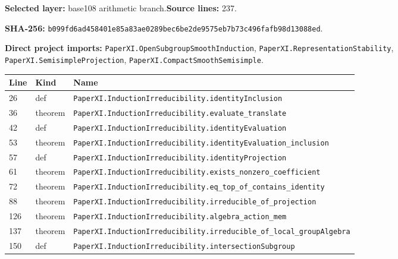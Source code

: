 \documentclass[10pt,oneside]{book}
\begin{document}
\textbf{Selected layer:} base108 arithmetic branch.\quad\textbf{Source lines:} 237.\par\textbf{SHA-256:} {\scriptsize\nolinkurl{b099fd6ad458401e85a83ae0289bec6be2de9575eb7b73c496fafb98d13088ed}}.


\textbf{Direct project imports:} \nolinkurl{PaperXI.OpenSubgroupSmoothInduction}, \nolinkurl{PaperXI.RepresentationStability}, \nolinkurl{PaperXI.SemisimpleProjection}, \nolinkurl{PaperXI.CompactSmoothSemisimple}.

\begin{longtable}{@{}p{}p{}p{}@{}}\toprule Line&Kind&Name\\\midrule\endhead

26&def&\nolinkurl{PaperXI.InductionIrreducibility.identityInclusion}\\

36&theorem&\nolinkurl{PaperXI.InductionIrreducibility.evaluate_translate}\\

42&def&\nolinkurl{PaperXI.InductionIrreducibility.identityEvaluation}\\

53&theorem&\nolinkurl{PaperXI.InductionIrreducibility.identityEvaluation_inclusion}\\

57&def&\nolinkurl{PaperXI.InductionIrreducibility.identityProjection}\\

61&theorem&\nolinkurl{PaperXI.InductionIrreducibility.exists_nonzero_coefficient}\\

72&theorem&\nolinkurl{PaperXI.InductionIrreducibility.eq_top_of_contains_identity}\\

88&theorem&\nolinkurl{PaperXI.InductionIrreducibility.irreducible_of_projection}\\

126&theorem&\nolinkurl{PaperXI.InductionIrreducibility.algebra_action_mem}\\

137&theorem&\nolinkurl{PaperXI.InductionIrreducibility.irreducible_of_local_groupAlgebra}\\

150&def&\nolinkurl{PaperXI.InductionIrreducibility.intersectionSubgroup}\\


\end{longtable}
\end{document}
